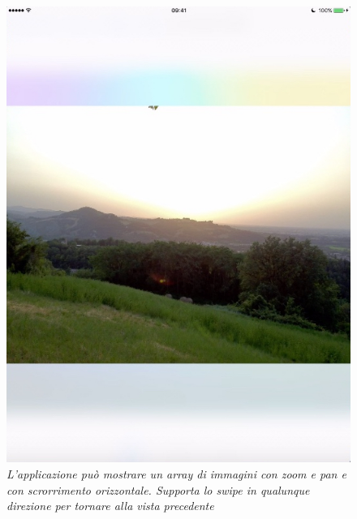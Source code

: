 \begin{figure}[H]
      \centering
      \includegraphics[scale=0.70]{immagini/app_foto.jpg}
            \vspace{0.8cm}
            \caption{\textit{L'applicazione può mostrare un array di immagini con zoom e pan e con scrorrimento orizzontale. Supporta lo swipe in qualunque direzione per tornare alla vista precedente}}
\end{figure}
